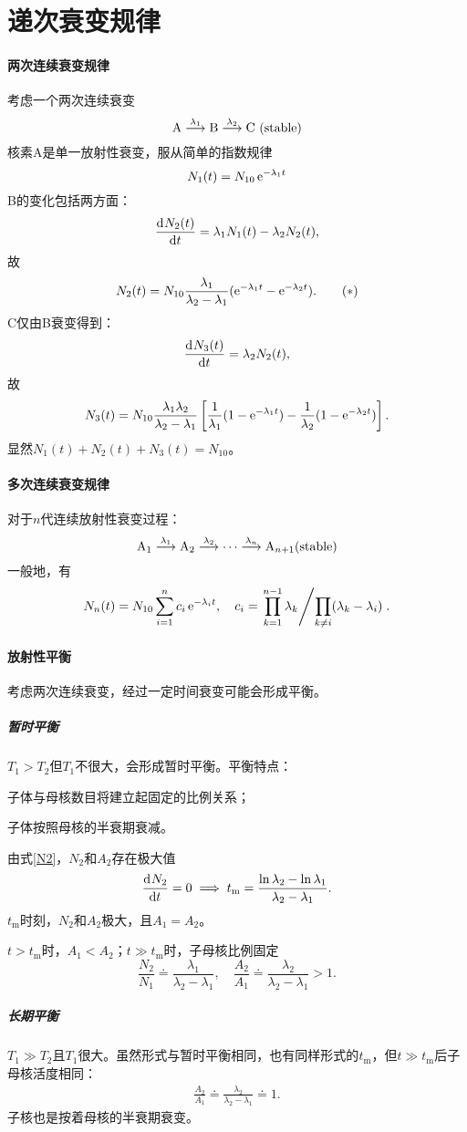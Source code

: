 \section{递次衰变规律}

\paragraph{两次连续衰变规律}
考虑一个两次连续衰变
\[
	\mathrm{A}\overset{\lambda_1}{\longrightarrow }\mathrm{B}\overset{\lambda_2}{\longrightarrow }\mathrm{C}~(\mathrm{stable})
\]
核素A是单一放射性衰变，服从简单的指数规律
\[
	N_1(t)=N_{10}\mathop{}\!\mathrm{e}^{-\lambda_1t}
\]
B的变化包括两方面：
\[
	\frac{\mathrm{d}^{{}}N_2(t)}{\mathrm{d}{t}^{{}}}=\lambda_1N_1(t)-\lambda_2N_2(t),
\]
故
\[\label{N2}
	N_2(t)=N_{10}\frac{\lambda_1}{\lambda_2-\lambda_1}(\mathop{}\!\mathrm{e}^{-\lambda_1t}-\mathop{}\!\mathrm{e}^{-\lambda_2t}).\tag{$\ast$}
\]
C仅由B衰变得到：
\[
	\frac{\mathrm{d}^{{}}N_3(t)}{\mathrm{d}{t}^{{}}}=\lambda_2N_2(t),
\]
故
\[
	N_3(t)=N_{10}\frac{\lambda_1\lambda_2}{\lambda_2-\lambda_1}\left[\frac1{\lambda_1}(1-\mathop{}\!\mathrm{e}^{-\lambda_1t})-\frac1{\lambda_2}(1-\mathop{}\!\mathrm{e}^{-\lambda_2t})\right].
\]
显然$N_1(t)+N_2(t)+N_3(t)=N_{10}$。
\paragraph{多次连续衰变规律}
对于$n$代连续放射性衰变过程：
\[
	\mathrm{A}_1\overset{\lambda_1}{\longrightarrow }\mathrm{A}_2\overset{\lambda_2}{\longrightarrow }\cdots\overset{\lambda_n}{\longrightarrow }\mathrm{A}_{n+1}(\mathrm{stable})
\]
一般地，有
\[
	N_n(t)=N_{10}\sum_{i=1}^nc_i\mathop{}\!\mathrm{e}^{-\lambda_it},\quad c_i=\left.{\prod_{k=1}^{n-1}\lambda_k}\middle/{\prod_{k\neq i}(\lambda_k-\lambda_i)}\right..
\]
\paragraph{放射性平衡}考虑两次连续衰变，经过一定时间衰变可能会形成平衡。
\subparagraph{暂时平衡}$T_1>T_2$但$T_1$不很大，会形成暂时平衡。平衡特点：
\begin{compactenum}
	\item 子体与母核数目将建立起固定的比例关系；
	\item 子体按照母核的半衰期衰减。
\end{compactenum}
由式\eqref{N2}，$N_2$和$A_2$存在极大值
\begin{align}
	\frac{\mathrm{d}^{{}}N_2}{\mathrm{d}{t}^{{}}}=0\implies t_\mathrm m=\frac{\ln\lambda_2-\ln\lambda_1}{\lambda_2-\lambda_1}.
\end{align}
$t_\mathrm m$时刻，$N_2$和$A_2$极大，且$A_1=A_2$。

$t>t_\mathrm m$时，$A_1<A_2$；$t\gg t_\mathrm m$时，子母核比例固定
\[
	\frac{N_2}{N_1}\doteq\frac{\lambda_1}{\lambda_2-\lambda_1},\quad\frac{A_2}{A_1}\doteq\frac{\lambda_2}{\lambda_2-\lambda_1}>1.
\]
\subparagraph{长期平衡}$T_1\gg T_2$且$T_1$很大。虽然形式与暂时平衡相同，也有同样形式的$t_\mathrm m$，但$t\gg t_\mathrm m$后子母核活度相同：
\begin{align}
	\frac{A_2}{A_1}\doteq\frac{\lambda_2}{\lambda_2-\lambda_1}\doteq 1.
\end{align}
子核也是按着母核的半衰期衰变。

